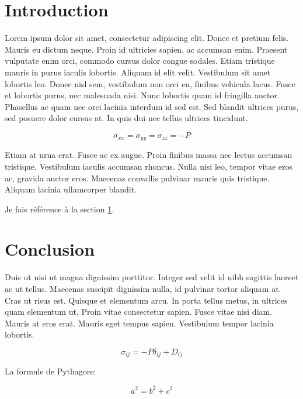 \documentclass[a4paper]{article}
\begin{document}
\tableofcontents



\section{Introduction}\label{section1}



Lorem ipsum dolor sit amet, consectetur adipiscing elit. Donec et pretium felis. Mauris eu dictum neque. Proin id ultricies sapien, ac accumsan enim. Praesent vulputate enim orci, commodo cursus dolor congue sodales. Etiam tristique mauris in purus iaculis lobortis. Aliquam id elit velit. Vestibulum sit amet lobortis leo. Donec nisl sem, vestibulum non orci eu, finibus vehicula lacus. Fusce et lobortis purus, nec malesuada nisi. Nunc lobortis quam id fringilla auctor. Phasellus ac quam nec orci lacinia interdum id sed est. Sed blandit ultrices purus, sed posuere dolor cursus at. In quis dui nec tellus ultrices tincidunt.

\begin{equation}
  \label{eq:73}
  \sigma_{xx} = \sigma_{yy} = \sigma_{zz} = -P
\end{equation}

Etiam at urna erat. Fusce ac ex augue. Proin finibus massa nec lectus accumsan tristique. Vestibulum iaculis accumsan rhoncus. Nulla nisi leo, tempor vitae eros ac, gravida auctor eros. Maecenas convallis pulvinar mauris quis tristique. Aliquam lacinia ullamcorper blandit.

Je fais référence à la section \ref{section1}.


\section{Conclusion}
Duis ut nisi ut magna dignissim porttitor. Integer sed velit id nibh sagittis laoreet ac ut tellus. Maecenas suscipit dignissim nulla, id pulvinar tortor aliquam at. Cras ut risus est. Quisque et elementum arcu. In porta tellus metus, in ultrices quam elementum ut. Proin vitae consectetur sapien. Fusce vitae nisi diam. Mauris at eros erat. Mauris eget tempus sapien. Vestibulum tempor lacinia lobortis.

\begin{equation}
  \label{eq:39}
  \sigma_{ij} = -P\delta_{ij} +D_{ij} 
\end{equation}


La formule de Pythagore:

\begin{equation}
a^2=b^2+c^2 \label{pythagore}
\end{equation}
\end{document}
